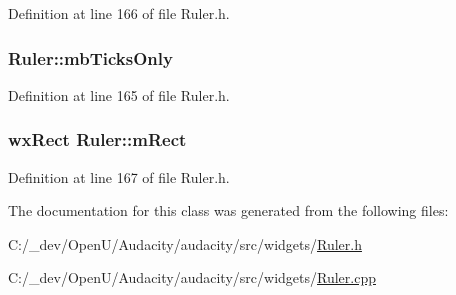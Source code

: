 Definition at line 166 of file Ruler.\+h.

\subsubsection[{\texorpdfstring{mb\+Ticks\+Only}{mbTicksOnly}}]{ Ruler\+::mb\+Ticks\+Only}\hypertarget{class_ruler_a5198b436d8a21213a07947ac22e0dac9}{}\label{class_ruler_a5198b436d8a21213a07947ac22e0dac9}


Definition at line 165 of file Ruler.\+h.

\subsubsection[{\texorpdfstring{m\+Rect}{mRect}}]{\setlength{\rightskip}{0pt plus 5cm}wx\+Rect Ruler\+::m\+Rect}\hypertarget{class_ruler_ab4db84a1b529ca41c65127d2e692785f}{}\label{class_ruler_ab4db84a1b529ca41c65127d2e692785f}


Definition at line 167 of file Ruler.\+h.



The documentation for this class was generated from the following files\+:\begin{DoxyCompactItemize}
\item 
C\+:/\+\_\+dev/\+Open\+U/\+Audacity/audacity/src/widgets/\hyperlink{_ruler_8h}{Ruler.\+h}\item 
C\+:/\+\_\+dev/\+Open\+U/\+Audacity/audacity/src/widgets/\hyperlink{_ruler_8cpp}{Ruler.\+cpp}\end{DoxyCompactItemize}
